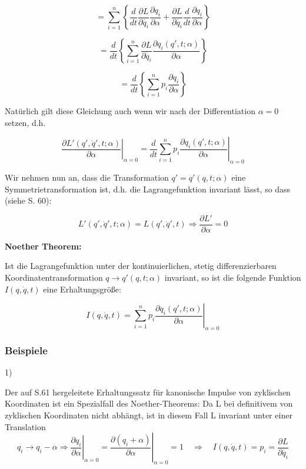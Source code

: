 \documentclass[10pt, letterpaper]{article}
\begin{document}
\[= \sum_{i=1}^n \left\{\frac{d}{dt}\frac{\partial L}{\partial \dot{q_i}}\frac{\partial q_i}{\partial \alpha} + \frac{\partial L}{\partial \dot{q_i}}\frac{d}{dt}\frac{\partial q_i}{\partial \alpha}\right\}\]

\[= \frac{d}{dt}\left\{\sum_{i=1}^n \frac{\partial L}{\partial \dot{q_i}}\frac{\partial q_i(q',t;\alpha)}{\partial \alpha}\right\}\]

\[= \frac{d}{dt}\left\{\sum_{i=1}^n p_i\frac{\partial q_i}{\partial \alpha}\right\}\]

Natürlich gilt diese Gleichung auch wenn wir nach der Differentiation $\alpha=0$ setzen, d.h.

\[\left.\frac{\partial L'(q',\dot{q}',t;\alpha)}{\partial \alpha}\right|_{\alpha=0} = \frac{d}{dt}\sum_{i=1}^n p_i\left.\frac{\partial q_i(q',t;\alpha)}{\partial \alpha}\right|_{\alpha=0}\]

Wir nehmen nun an, dass die Transformation $q'=q'(q,t;\alpha)$ eine Symmetrietransformation ist, d.h. die Lagrangefunktion invariant lässt, so dass (siehe S. 60):

\[L'(q',\dot{q}',t;\alpha) = L(q',\dot{q}',t) \Rightarrow \frac{\partial L'}{\partial \alpha} = 0\]



\textbf{Noether Theorem:}

Ist die Lagrangefunktion unter der kontinuierlichen, stetig differenzierbaren Koordinatentransformation $q\to q'(q,t;\alpha)$ invariant, so ist die folgende Funktion $I(q,\dot{q},t)$ eine Erhaltungsgröße:

\[I(q,\dot{q},t) = \sum_{i=1}^n p_i\left.\frac{\partial q_i(q',t;\alpha)}{\partial \alpha}\right|_{\alpha=0}\]




\subsubsection{Beispiele}

1) 

Der auf S.61 hergeleitete Erhaltungssatz für kanonische Impulse von zyklischen Koordinaten ist ein Spezialfall des Noether-Theorems: Da L bei definitivem von zyklischen Koordinaten nicht abhängt, ist in diesem Fall L invariant unter einer Translation 
$$q_i \rightarrow q_i - \alpha \Rightarrow \left.\frac{\partial q_i}{\partial \alpha}\right|_{\alpha=0} = \left.\frac{\partial (q_i+\alpha)}{\partial \alpha}\right|_{\alpha=0} = 1 \quad \Rightarrow\quad I(q,\dot{q},t) = p_i = \frac{\partial L}{\partial \dot{q_i}}$$
\end{document}
